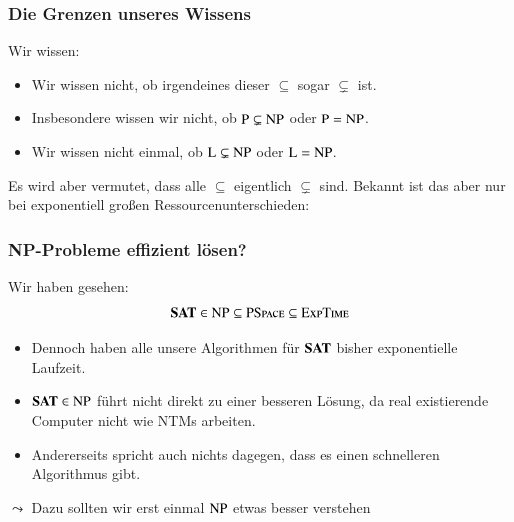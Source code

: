 \documentclass[aspectratio=1610,onlymath]{beamer}
\begin{document}
\begin{frame}\frametitle{Die Grenzen unseres Wissens}

Wir wissen:

\theobox{
\[\Scomplclass{L}\subseteq\Scomplclass{NL}\subseteq \Scomplclass{P}\subseteq\Scomplclass{NP}\subseteq\Scomplclass{PSpace}= \Scomplclass{NPSpace}\subseteq \Scomplclass{Exp}\subseteq \Scomplclass{NExp}\]
\vspace{-2.5ex}
}

\begin{itemize}
\item Wir wissen nicht, ob irgendeines dieser $\subseteq$ sogar $\subsetneq$ ist.
\item Insbesondere wissen wir nicht, ob ${\textsc{P}}\subsetneq{\textsc{NP}}$ oder ${\textsc{P}}={\textsc{NP}}$.
\item Wir wissen nicht einmal, ob ${\textsc{L}}\subsetneq{\textsc{NP}}$ oder ${\textsc{L}}={\textsc{NP}}$.
\end{itemize}\pause
Es wird aber vermutet, dass alle  $\subseteq$ eigentlich $\subsetneq$ sind.
% 
Bekannt ist das aber nur bei exponentiell großen Ressourcenunterschieden:


\end{frame}



\begin{frame}\frametitle{NP-Probleme effizient lösen?}

Wir haben gesehen:
\[ \textbf{\textcolor{black}{SAT}}\in{\textsc{NP}}\subseteq{\textsc{PSpace}}\subseteq{\textsc{ExpTime}}\]

\begin{itemize}
\item Dennoch haben alle unsere Algorithmen für $\textbf{\textcolor{black}{SAT}}$ bisher 
exponentielle Laufzeit.
\item $\textbf{\textcolor{black}{SAT}}\in{\textsc{NP}}$ führt nicht direkt zu einer besseren Lösung, da real existierende Computer nicht wie NTMs arbeiten.
\item Andererseits spricht auch nichts dagegen, dass es einen schnelleren Algorithmus gibt.
\end{itemize}

$\leadsto$ Dazu sollten wir erst einmal ${\textsc{NP}}$ etwas besser verstehen

\end{frame}
\end{document}
